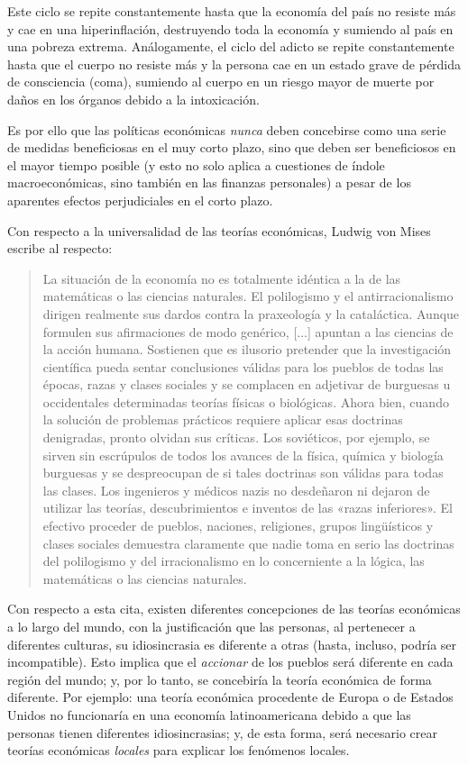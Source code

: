 \documentclass[12pt,a4paper,twoside]{book}
\begin{document}
Este ciclo se repite constantemente hasta que la economía del país no resiste más y cae en una hiperinflación, destruyendo toda la economía y sumiendo al país en una pobreza extrema. Análogamente, el ciclo del adicto se repite constantemente hasta que el cuerpo no resiste más y la persona cae en un estado grave de pérdida de consciencia (coma), sumiendo al cuerpo en un riesgo mayor de muerte por daños en los órganos debido a la intoxicación.

Es por ello que las políticas económicas \textit{nunca} deben concebirse como una serie de medidas beneficiosas en el muy corto plazo, sino que deben ser beneficiosos en el mayor tiempo posible (y esto no solo aplica a cuestiones de índole macroeconómicas, sino también en las finanzas personales) a pesar de los aparentes efectos perjudiciales en el corto plazo.

Con respecto a la universalidad de las teorías económicas, Ludwig von Mises escribe al respecto:

\begin{quotation}
La situación de la economía no es totalmente idéntica a la de las matemáticas o las ciencias naturales. El polilogismo y el antirracionalismo dirigen realmente sus dardos contra la praxeología y la cataláctica. Aunque formulen sus afirmaciones de modo genérico, [...] apuntan a las ciencias de la acción humana. Sostienen que es ilusorio pretender que la investigación científica pueda sentar conclusiones válidas para los pueblos de todas las épocas, razas y clases sociales y se complacen en adjetivar de burguesas u occidentales determinadas teorías físicas o biológicas. Ahora bien, cuando la solución de problemas prácticos requiere aplicar esas doctrinas denigradas, pronto olvidan sus críticas. Los soviéticos, por ejemplo, se sirven sin escrúpulos de todos los avances de la física, química y biología burguesas y se despreocupan de si tales doctrinas son válidas para todas las clases. Los ingenieros y médicos nazis no desdeñaron ni dejaron de utilizar las teorías, descubrimientos e inventos de las «razas inferiores». El efectivo proceder de pueblos, naciones, religiones, grupos lingüísticos y clases sociales demuestra claramente que nadie toma en serio las doctrinas del polilogismo y del irracionalismo en lo concerniente a la lógica, las matemáticas o las ciencias naturales. \cite[pág. 6]{mises:lah}
\end{quotation}

Con respecto a esta cita, existen diferentes concepciones de las teorías económicas a lo largo del mundo, con la justificación que las personas, al pertenecer a diferentes culturas, su idiosincrasia es diferente a otras (hasta, incluso, podría ser incompatible). Esto implica que el \textit{accionar} de los pueblos será diferente en cada región del mundo; y, por lo tanto, se concebiría la teoría económica de forma diferente. Por ejemplo: una teoría económica procedente de Europa o de Estados Unidos no funcionaría en una economía latinoamericana debido a que las personas tienen diferentes idiosincrasias; y, de esta forma, será necesario crear teorías económicas \textit{locales} para explicar los fenómenos locales.
\end{document}
